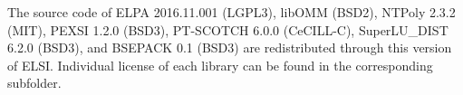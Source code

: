 \documentclass{report}
\begin{document}
The source code of ELPA 2016.11.001 (LGPL3), libOMM (BSD2), NTPoly 2.3.2 (MIT), PEXSI 1.2.0 (BSD3), PT-SCOTCH 6.0.0 (CeCILL-C), SuperLU\_DIST 6.2.0 (BSD3), and BSEPACK 0.1 (BSD3) are redistributed through this version of ELSI. Individual license of each library can be found in the corresponding subfolder.
\end{document}
